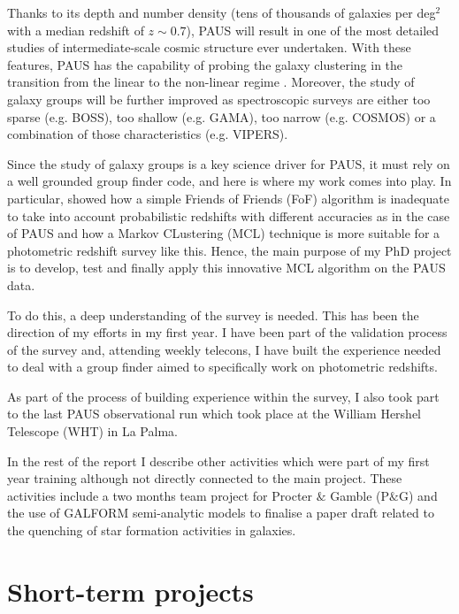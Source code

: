 \documentclass[letterpaper]{article}
\begin{document}
Thanks to its depth and number density (tens of thousands of galaxies per deg$^2$ with a median redshift of $z \sim 0.7$), PAUS will result in one of the most detailed studies of intermediate-scale cosmic structure ever undertaken. With these features, PAUS has the capability of probing the galaxy clustering in the transition from the linear to the non-linear regime \citep{stothert18_thesis}. Moreover, the study of galaxy groups will be further improved as spectroscopic surveys are either too sparse (e.g. BOSS), too shallow (e.g. GAMA), too narrow (e.g. COSMOS) or a combination of those characteristics (e.g. VIPERS).

Since the study of galaxy groups is a key science driver for PAUS, it must rely on a well grounded group finder code, and here is where my work comes into play. In particular, \cite{stothert18_thesis} showed how a simple Friends of Friends (FoF) algorithm is inadequate to take into account probabilistic redshifts with different accuracies as in the case of PAUS and how a Markov CLustering (MCL) technique is more suitable for a photometric redshift survey like this. Hence, the main purpose of my PhD project is to develop, test and finally apply this innovative MCL algorithm on the PAUS data. 

To do this, a deep understanding of the survey is needed. This has been the direction of my efforts in my first year. I have been part of the validation process of the survey and, attending weekly telecons, I have built the experience needed to deal with a group finder aimed to specifically work on photometric redshifts. 

As part of the process of building experience within the survey, I also took part to the last PAUS observational run which took place at the William Hershel Telescope (WHT) in La Palma. 

In the rest of the report I describe other activities which were part of my first year training although not directly connected to the main project. These activities include a two months team project for Procter $\&$ Gamble (P$\&$G) and the use of GALFORM semi-analytic models to finalise a paper draft related to the quenching of star formation activities in galaxies.




\section{Short-term projects}
\label{sec:short}
\end{document}
